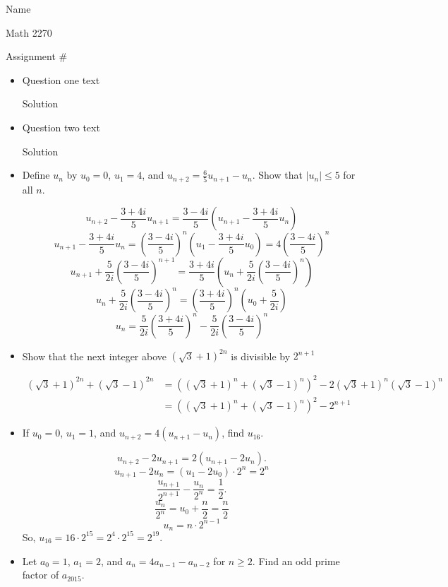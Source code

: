 \documentclass[12pt]{article}
\begin{document}
\hfill Name 

\hfill Math 2270

\hfill Assignment \#


\begin{itemize}
\item[1)] Question one text

Solution

\item[2)] Question two text

Solution

\item[4)] Define $u_n$ by $u_0 = 0$, $u_1 = 4$, and $u_{n+2} = \frac{6}{5}u_{n+1} - u_n$. Show that $|u_n|\leq 5$ for all $n$.

\[
u_{n+2} - \frac{3+4i}{5}u_{n+1} = \frac{3-4i}{5}(u_{n+1}- \frac{3+4i}{5}u_n)
\]
\[
u_{n+1} - \frac{3+4i}{5}u_{n} = \left(\frac{3-4i}{5}\right)^n(u_1- \frac{3+4i}{5}u_0) = 4\left(\frac{3-4i}{5}\right)^n
\]
\[
u_{n+1} + \frac{5}{2i} \left(\frac{3-4i}{5}\right)^{n+1} = \frac{3+4i}{5}\left(u_{n} +\frac{5}{2i}\left(\frac{3-4i}{5}\right)^n\right)
\]
\[
u_n + \frac{5}{2i} \left(\frac{3-4i}{5}\right)^n=\left(\frac{3+4i}{5}\right)^n\left(u_0+ \frac{5}{2i}\right)
\]
\[
u_n = \frac{5}{2i}\left(\frac{3+4i}{5}\right)^n-\frac{5}{2i} \left(\frac{3-4i}{5}\right)^n
\]

\item[5)] Show that the next integer above $(\sqrt{3}+1)^{2n}$ is divisible by $2^{n+1}$

\[
\begin{aligned}
    (\sqrt{3}+1)^{2n}+(\sqrt{3}-1)^{2n}
    &=\left((\sqrt{3}+1)^{n}+(\sqrt{3}-1)^{n}\right)^2-2(\sqrt{3}+1)^{n}(\sqrt{3}-1)^{n}\\
    &=\left((\sqrt{3}+1)^{n}+(\sqrt{3}-1)^{n}\right)^2-2^{n+1}
\end{aligned}
\]

\item[9)] If $u_0 = 0$, $u_1 = 1$, and $u_{n+2} = 4(u_{n+1} - u_n)$, find $u_{16}$.

\[
u_{n+2} - 2u_{n+1} = 2(u_{n+1} - 2u_n).
\]
\[
u_{n+1} - 2u_n =(u_{1} - 2u_0) \cdot 2^n=2^n
\]
\[
\frac{u_{n+1}}{2^{n+1}} - \frac{u_n}{2^n} = \frac{1}{2}.
\]
\[
\frac{u_n}{2^n} = u_0 + \frac{n}{2}=\frac{n}{2}
\]
\[
u_n = n \cdot 2^{n-1}
\]
So, $u_{16} = 16 \cdot 2^{15} = 2^4 \cdot 2^{15} = 2^{19}$.


\item[10)] Let $a_0 = 1$, $a_1 = 2$, and $a_n = 4a_{n-1} - a_{n-2}$ for $n \ge 2$.
Find an odd prime factor of
$a_{2015}$.


\end{itemize}
\end{document}
